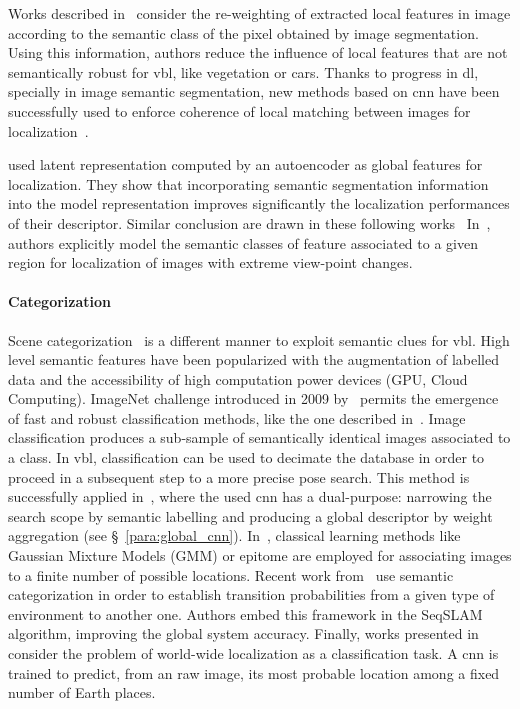 			 Works described in~\citep{Arandjelovic2014a,Mousavian2015} consider the re-weighting of extracted local features in image according to the semantic class of the pixel obtained by image segmentation. Using this information, authors reduce the influence of local features that are not semantically robust for \ac{vbl}, like vegetation or cars. Thanks to progress in \ac{dl}, specially in image semantic segmentation, new methods based on \ac{cnn} have been successfully used to enforce coherence of local matching between images for localization~\citep{Shi2019,Toft2018}.			 
			 
			 \citet{Schonberger2017a} used latent representation computed by an autoencoder as global features for localization. They show that incorporating semantic segmentation information into the model representation improves significantly the localization performances of their descriptor. Similar conclusion are drawn in these following works~\citep{Seymour2018,Radwan2018} In~\citep{Garg2018,Garg2018a}, authors explicitly model the semantic classes of feature associated to a given region for localization of images with extreme view-point changes.
	    	
		\paragraph{Categorization}
			Scene categorization~\citep{Wu2009} is a different manner to exploit semantic clues for \ac{vbl}. High level semantic features have been popularized with the augmentation of labelled data and the accessibility of high computation power devices (GPU, Cloud Computing). ImageNet challenge introduced in 2009 by~\citep{Deng2009} permits the emergence of fast and robust classification methods, like the one described in~\citep{Krizhevsky2012}. Image classification produces a sub-sample of semantically identical images associated to a class. In \ac{vbl}, classification can be used to decimate the database in order to proceed in a subsequent step to a more precise pose search. This method is successfully applied in~\citep{Sunderhauf2015}, where the used \ac{cnn} has a dual-purpose: narrowing the search scope by semantic labelling and producing a global descriptor by weight aggregation (see \S~\ref{para:global_cnn}). In~\citep{torralba2003context,Ni2009}, classical learning methods like Gaussian Mixture Models (GMM) or epitome are employed for associating images to a finite number of possible locations. Recent work from~\citep{Garg2017} use semantic categorization in order to establish transition probabilities from a given type of environment to another one. Authors embed this framework in the SeqSLAM algorithm, improving the global system accuracy. Finally, works presented in~\citep{Weyand2016,Seo2018} consider the problem of world-wide localization as a classification task. A \ac{cnn} is trained to predict, from an raw image, its most probable location among a fixed number of Earth places.

